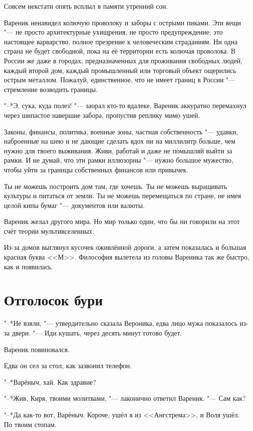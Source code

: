 Совсем некстати опять всплыл в памяти утренний сон.

Вареник ненавидел колючую проволоку и заборы с острыми пиками.
Эти вещи "--- не просто архитектурные ухищрения, не просто предупреждение;
это настоящее варварство, полное презрение к человеческим страданиям.
Ни одна страна не будет свободной, пока на её территории есть колючая проволока.
В России же даже в городах, предназначенных для проживания свободных людей, каждый второй дом, каждый промышленный или торговый объект ощерились острым металлом.
Пожалуй, единственное, что не имеет границ в России "--- стремление возводить границы.

"--*Э, сука, куда полез! "--- заорал кто-то вдалеке.
Вареник аккуратно перемахнул через шипастое навершие забора, пропустив реплику мимо ушей.

Законы, финансы, политика, военные зоны, частная собственность "--- удавки, наброенные на шею и не дающие сделать вдох ни на миллилитр больше, чем нужно для твоего выживания.
Живи, работай и даже не помышляй выйти за рамки.
И не думай, что эти рамки иллюзорны "--- нужно большое мужество, чтобы уйти за границы собственных финансов или привычек.

Ты не можешь построить дом там, где хочешь. 
Ты не можешь выращивать культуры и питаться от земли.
Ты не можешь перемещаться по стране, не имея целой кипы бумаг "--- документов или валюты.

Вареник желал другого мира.
Но мир только один, что бы ни говорили на этот счёт теории мультивселенных.

\ldotst Из-за домов выглянул кусочек оживлённой дороги, а затем показалась и большая красная буква <<М>>.
Философия вылетела из головы Вареника так же быстро, как и появилась.

\section{Отголосок бури}

"--*Не взяли, "--- утвердительно сказала Вероника, едва лицо мужа показалось из-за двери.
"--- Иди кушать, через десять минут готово будет.

Вареник повиновался.

Едва он сел за стол, как зазвонил телефон.

"--*Варёныч, хай.
Как здравие?

"--*Жив, Киря, твоими молитвами, "--- лаконично ответил Вареник.
"--- Сам как?

"--*Да как-то вот, Варёныч.
Короче, ушёл я из <<Ангстрема>>, и Воля ушёл.
По твоим стопам.

